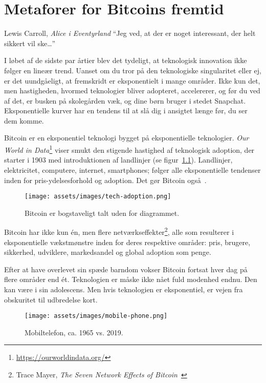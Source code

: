 \chapter{Metaforer for Bitcoins fremtid}
\label{les:21}

\begin{chapquote}{Lewis Carroll, \textit{Alice i Eventyrland}}
\enquote{Jeg ved, at der er noget interessant, der helt sikkert vil ske\ldots}
\end{chapquote}

I løbet af de sidste par årtier blev det tydeligt, at teknologisk innovation 
ikke følger en lineær trend. Uanset om du tror på den teknologiske singularitet 
eller ej, er det uundgåeligt, at fremskridt er eksponentielt i mange områder. 
Ikke kun det, men hastigheden, hvormed teknologier bliver adopteret, 
accelererer, og før du ved af det, er busken på skolegården væk, og dine 
børn bruger i stedet Snapchat. Eksponentielle kurver har en tendens til at 
slå dig i ansigtet længe før, du ser dem komme.

Bitcoin er en eksponentiel teknologi bygget på eksponentielle teknologier.
\textit{Our World in Data}\footnote{\url{https://ourworldindata.org/}} viser 
smukt den stigende hastighed af teknologisk adoption, der starter i 1903 med 
introduktionen af landlinjer (se figur~\ref{fig:tech-adoption}). Landlinjer, 
elektricitet, computere, internet, smartphones; følger alle eksponentielle 
tendenser inden for pris-ydelsesforhold og adoption. Det gør Bitcoin 
også~\cite{tech-adoption}.

\begin{figure}[htbp]
  \centering
  \texttt{[image: assets/images/tech-adoption.png]}
  \caption{Bitcoin er bogstaveligt talt uden for diagrammet.}
  \label{fig:tech-adoption}
\end{figure}

Bitcoin har ikke kun én, men flere netværkseffekter\footnote{Trace Mayer,
\textit{The Seven Network Effects of Bitcoin}~\cite{7-network-effects}}, alle
som resulterer i eksponentielle vækstmønstre inden for deres respektive 
områder: pris, brugere, sikkerhed, udviklere, markedsandel og global adoption 
som penge.

Efter at have overlevet sin spæde barndom vokser Bitcoin fortsat hver dag på
flere områder end ét. Teknologien er måske ikke nået fuld modenhed endnu.
Den kan være i sin adolescens. Men hvis teknologien er eksponentiel, er vejen
fra obskuritet til udbredelse kort.

\begin{figure}[htbp]
  \centering
  \texttt{[image: assets/images/mobile-phone.png]}
  \caption{Mobiltelefon, ca. 1965 vs. 2019.}
  \label{fig:mobile-phone}
\end{figure}

